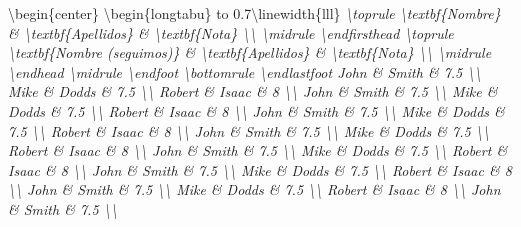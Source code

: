 \documentclass[11pt]{article}
\newenvironment{Shaded}{}{}
\newcommand{\CommentTok}[1]{\textcolor[rgb]{0.38,0.63,0.69}{\textit{{#1}}}}
\newcommand{\NormalTok}[1]{{#1}}
\begin{document}
\begin{Shaded}
\begin{Highlighting}[]
\NormalTok{\textbackslash{}begin\{center\}}
\NormalTok{\textbackslash{}begin\{longtabu\} to 0.7\textbackslash{}linewidth\{lll\} % la tabla va a ocupar el 70% de la línea}
\CommentTok{% empieza la primera cabecera}
\NormalTok{\textbackslash{}toprule}
\NormalTok{\textbackslash{}textbf\{Nombre\} & \textbackslash{}textbf\{Apellidos\} & \textbackslash{}textbf\{Nota\} \textbackslash{}\textbackslash{}}
\NormalTok{\textbackslash{}midrule}
\NormalTok{\textbackslash{}endfirsthead}
\CommentTok{% ahora la cabecera para el resto de páginas}
\NormalTok{\textbackslash{}toprule}
\NormalTok{\textbackslash{}textbf\{Nombre (seguimos)\} & \textbackslash{}textbf\{Apellidos\} & \textbackslash{}textbf\{Nota\} \textbackslash{}\textbackslash{}}
\NormalTok{\textbackslash{}midrule}
\NormalTok{\textbackslash{}endhead}
\CommentTok{% ahora el pie de tabla para cada página}
\NormalTok{\textbackslash{}midrule}
\NormalTok{\textbackslash{}endfoot}
\CommentTok{% y el pie de página para la última página}
\NormalTok{\textbackslash{}bottomrule}
\NormalTok{\textbackslash{}endlastfoot}
\CommentTok{% ahora ya escribimos los datos de la tabla}
\NormalTok{John & Smith & 7.5 \textbackslash{}\textbackslash{}}
\NormalTok{Mike & Dodds & 7.5 \textbackslash{}\textbackslash{}}
\NormalTok{Robert & Isaac & 8 \textbackslash{}\textbackslash{}}
\NormalTok{John & Smith & 7.5 \textbackslash{}\textbackslash{}}
\NormalTok{Mike & Dodds & 7.5 \textbackslash{}\textbackslash{}}
\NormalTok{Robert & Isaac & 8 \textbackslash{}\textbackslash{}}
\NormalTok{John & Smith & 7.5 \textbackslash{}\textbackslash{}}
\NormalTok{Mike & Dodds & 7.5 \textbackslash{}\textbackslash{}}
\NormalTok{Robert & Isaac & 8 \textbackslash{}\textbackslash{}}
\NormalTok{John & Smith & 7.5 \textbackslash{}\textbackslash{}}
\NormalTok{Mike & Dodds & 7.5 \textbackslash{}\textbackslash{}}
\NormalTok{Robert & Isaac & 8 \textbackslash{}\textbackslash{}}
\NormalTok{John & Smith & 7.5 \textbackslash{}\textbackslash{}}
\NormalTok{Mike & Dodds & 7.5 \textbackslash{}\textbackslash{}}
\NormalTok{Robert & Isaac & 8 \textbackslash{}\textbackslash{}}
\NormalTok{John & Smith & 7.5 \textbackslash{}\textbackslash{}}
\NormalTok{Mike & Dodds & 7.5 \textbackslash{}\textbackslash{}}
\NormalTok{Robert & Isaac & 8 \textbackslash{}\textbackslash{}}
\NormalTok{John & Smith & 7.5 \textbackslash{}\textbackslash{}}
\NormalTok{Mike & Dodds & 7.5 \textbackslash{}\textbackslash{}}
\NormalTok{Robert & Isaac & 8 \textbackslash{}\textbackslash{}}
\NormalTok{John & Smith & 7.5 \textbackslash{}\textbackslash{}}
}}}}}}
\end{Highlighting}
\end{Shaded}
\end{document}
